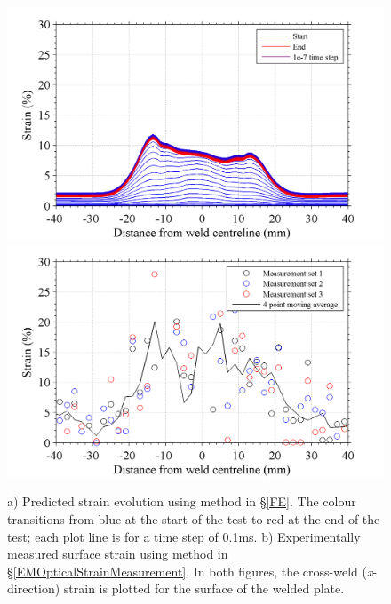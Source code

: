 \begin{figure}
	\centering
	\includegraphics[width=0.7\linewidth]{BlastStrainPredictaltered}
	\includegraphics[width=0.7\linewidth]{BlastStrainaltered}
	\caption[Mesh]{a) Predicted strain evolution using method in \S\ref{FE}. The colour transitions from blue at the start of the test to red at the end of the test; each plot line is for a time step of 0.1ms. b) Experimentally measured surface strain using method in \S\ref{EMOpticalStrainMeasurement}. In both figures, the cross-weld (\textit{x}-direction) strain is plotted for the surface of the welded plate.}
	\label{fig:BlastStrainPredicted}
\end{figure} 
